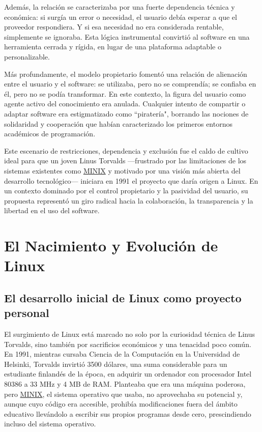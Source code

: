 \documentclass[a4paper,12pt]{article}
\begin{document}
Además, la relación se caracterizaba por una fuerte dependencia técnica y
económica: si surgía un error o necesidad, el usuario debía esperar a que el
proveedor respondiera. Y si esa necesidad no era considerada rentable,
simplemente se ignoraba. Esta lógica instrumental convirtió al software en una
herramienta cerrada y rígida, en lugar de una plataforma adaptable o
personalizable.

Más profundamente, el modelo propietario fomentó una relación de alienación
entre el usuario y el software: se utilizaba, pero no se comprendía; se confiaba
en él, pero no se podía transformar. En este contexto, la figura del usuario
como agente activo del conocimiento era anulada. Cualquier intento de compartir
o adaptar software era estigmatizado como ``piratería", borrando las nociones de
solidaridad y cooperación que habían caracterizado los primeros entornos
académicos de programación.

Este escenario de restricciones, dependencia y exclusión fue el caldo de cultivo
ideal para que un joven Linus Torvalds —frustrado por las limitaciones de los
sistemas existentes como \hyperref[minix]{MINIX} y motivado por una visión más abierta del
desarrollo tecnológico— iniciara en 1991 el proyecto que daría origen a Linux.
En un contexto dominado por el control propietario y la pasividad del usuario,
su propuesta representó un giro radical hacia la colaboración, la transparencia
y la libertad en el uso del software.

\newpage
\section{El Nacimiento y Evolución de Linux} 

\subsection{El desarrollo inicial de Linux como proyecto personal}

El surgimiento de Linux está marcado no solo por la curiosidad técnica de Linus
Torvalds, sino también por sacrificios económicos y una tenacidad poco común. En
1991, mientras cursaba Ciencia de la Computación en la Universidad de Helsinki,
Torvalds invirtió 3500 dólares, una suma considerable para un estudiante
finlandés de la época, en adquirir un ordenador con procesador Intel 80386 a 33
MHz y 4 MB de RAM. Planteaba que era una máquina poderosa, pero \hyperref[minix]{MINIX}, el
sistema operativo que usaba, no aprovechaba su potencial y, aunque cuyo código
era accesible, prohibía modificaciones fuera del ámbito educativo llevándolo a
escribir sus propios programas desde cero, prescindiendo incluso del sistema
operativo.
\end{document}
